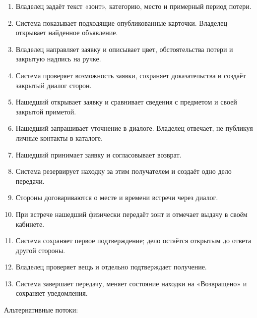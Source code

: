 \begin{enumerate}
\item Владелец задаёт текст «зонт», категорию, место и примерный период потери.
\item Система показывает подходящие опубликованные карточки. Владелец открывает найденное объявление.
\item Владелец направляет заявку и описывает цвет, обстоятельства потери и закрытую надпись на ручке.
\item Система проверяет возможность заявки, сохраняет доказательства и создаёт закрытый диалог сторон.
\item Нашедший открывает заявку и сравнивает сведения с предметом и своей закрытой приметой.
\item Нашедший запрашивает уточнение в диалоге. Владелец отвечает, не публикуя личные контакты в каталоге.
\item Нашедший принимает заявку и согласовывает возврат.
\item Система резервирует находку за этим получателем и создаёт одно дело передачи.
\item Стороны договариваются о месте и времени встречи через диалог.
\item При встрече нашедший физически передаёт зонт и отмечает выдачу в своём кабинете.
\item Система сохраняет первое подтверждение; дело остаётся открытым до ответа другой стороны.
\item Владелец проверяет вещь и отдельно подтверждает получение.
\item Система завершает передачу, меняет состояние находки на «Возвращено» и сохраняет уведомления.
\end{enumerate}

Альтернативные потоки:

